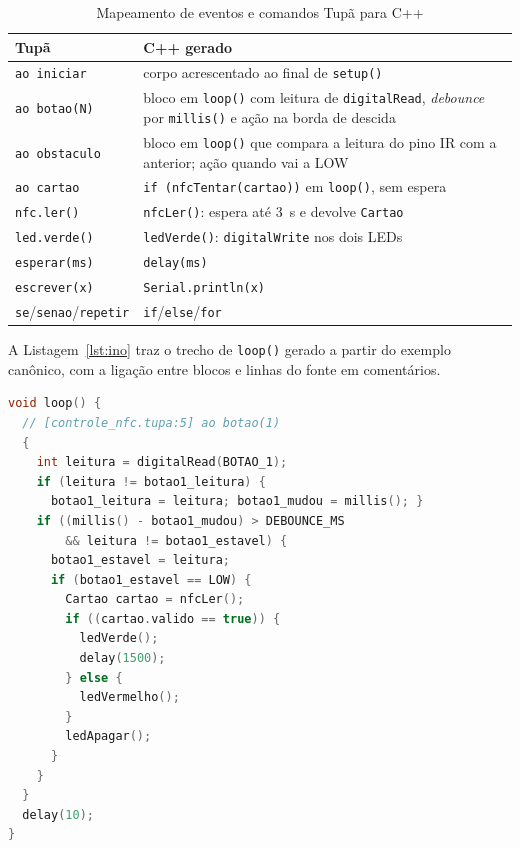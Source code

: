 \documentclass[conference]{IEEEtran}
\begin{document}
\begin{table}[htbp]
\caption{Mapeamento de eventos e comandos Tupã para C++}
\begin{center}
\footnotesize
\setlength{\tabcolsep}{3pt}
\begin{tabular}{lp{5cm}}
\toprule
\textbf{Tupã} & \textbf{C++ gerado} \\
\midrule
\texttt{ao iniciar} & corpo acrescentado ao final de \texttt{setup()} \\
\texttt{ao botao(N)} & bloco em \texttt{loop()} com leitura de \texttt{digitalRead}, \textit{debounce} por \texttt{millis()} e ação na borda de descida \\
\texttt{ao obstaculo} & bloco em \texttt{loop()} que compara a leitura do pino IR com a anterior; ação quando vai a LOW \\
\texttt{ao cartao} & \texttt{if (nfcTentar(cartao))} em \texttt{loop()}, sem espera \\
\texttt{nfc.ler()} & \texttt{nfcLer()}: espera até 3~s e devolve \texttt{Cartao} \\
\texttt{led.verde()} & \texttt{ledVerde()}: \texttt{digitalWrite} nos dois LEDs \\
\texttt{esperar(ms)} & \texttt{delay(ms)} \\
\texttt{escrever(x)} & \texttt{Serial.println(x)} \\
\texttt{se}/\texttt{senao}/\texttt{repetir} & \texttt{if}/\texttt{else}/\texttt{for} \\
\bottomrule
\end{tabular}
\label{tab:eventos}
\end{center}
\end{table}

A Listagem~\ref{lst:ino} traz o trecho de \texttt{loop()} gerado a partir do
exemplo canônico, com a ligação entre blocos e linhas do fonte em comentários.

\begin{lstlisting}[language={C++}, basicstyle=\ttfamily\tiny, numbers=none, xleftmargin=0pt, framexleftmargin=0pt, caption={Trecho do \texttt{controle\_nfc.ino} gerado.}, label={lst:ino}]
void loop() {
  // [controle_nfc.tupa:5] ao botao(1)
  {
    int leitura = digitalRead(BOTAO_1);
    if (leitura != botao1_leitura) {
      botao1_leitura = leitura; botao1_mudou = millis(); }
    if ((millis() - botao1_mudou) > DEBOUNCE_MS
        && leitura != botao1_estavel) {
      botao1_estavel = leitura;
      if (botao1_estavel == LOW) {
        Cartao cartao = nfcLer();
        if ((cartao.valido == true)) {
          ledVerde();
          delay(1500);
        } else {
          ledVermelho();
        }
        ledApagar();
      }
    }
  }
  delay(10);
}
\end{lstlisting}
\end{document}
